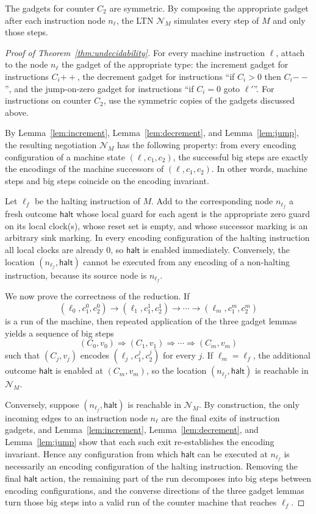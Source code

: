 The gadgets for counter $C_2$ are symmetric.  By composing the appropriate
gadget after each instruction node $n_\ell$, the LTN $\mathcal N_M$ simulates
every step of $M$ and only those steps.

\begin{proof}[Proof of Theorem~\ref{thm:undecidability}]
For every machine instruction $\ell$, attach to the node $n_\ell$ the gadget of
the appropriate type: the increment gadget for instructions $C_i{++}$, the
decrement gadget for instructions ``if $C_i>0$ then $C_i{--}$'', and the
jump-on-zero gadget for instructions ``if $C_i=0$ goto $\ell'$''.  For
instructions on counter $C_2$, use the symmetric copies of the gadgets discussed
above.

By Lemma~\ref{lem:increment}, Lemma~\ref{lem:decrement}, and
Lemma~\ref{lem:jump}, the resulting negotiation $\mathcal N_M$ has the
following property: from every encoding configuration of a machine state
$(\ell,c_1,c_2)$, the successful big steps are exactly the encodings of the
machine successors of $(\ell,c_1,c_2)$.  In other words, machine steps and big
steps coincide on the encoding invariant.

Let $\ell_f$ be the halting instruction of $M$.  Add to the corresponding node
$n_{\ell_f}$ a fresh outcome $\mathsf{halt}$ whose local guard for each agent is
the appropriate zero guard on its local clock(s), whose reset set is empty, and
whose successor marking is an arbitrary sink marking.  In every encoding
configuration of the halting instruction all local clocks are already $0$, so
$\mathsf{halt}$ is enabled immediately.  Conversely, the location
$(n_{\ell_f},\mathsf{halt})$ cannot be executed from any encoding of a
non-halting instruction, because its source node is $n_{\ell_f}$.

We now prove the correctness of the reduction.  If
\[
(\ell_0,c_1^0,c_2^0)\to (\ell_1,c_1^1,c_2^1)\to \cdots \to (\ell_m,c_1^m,c_2^m)
\]
is a run of the machine, then repeated application of the three gadget lemmas
yields a sequence of big steps
\[
(C_0,v_0)\Rightarrow (C_1,v_1)\Rightarrow \cdots \Rightarrow (C_m,v_m)
\]
such that $(C_j,v_j)$ encodes $(\ell_j,c_1^j,c_2^j)$ for every $j$.  If
$\ell_m=\ell_f$, the additional outcome $\mathsf{halt}$ is enabled at
$(C_m,v_m)$, so the location $(n_{\ell_f},\mathsf{halt})$ is reachable in
$\mathcal N_M$.

Conversely, suppose $(n_{\ell_f},\mathsf{halt})$ is reachable in
$\mathcal N_M$.  By construction, the only incoming edges to an instruction node
$n_\ell$ are the final exits of instruction gadgets, and
Lemma~\ref{lem:increment}, Lemma~\ref{lem:decrement}, and
Lemma~\ref{lem:jump} show that each such exit re-establishes the encoding
invariant.  Hence any configuration from which $\mathsf{halt}$ can be executed
at $n_{\ell_f}$ is necessarily an encoding configuration of the halting
instruction.  Removing the final $\mathsf{halt}$ action, the remaining part of
the run decomposes into big steps between encoding configurations, and the
converse directions of the three gadget lemmas turn those big steps into a valid
run of the counter machine that reaches $\ell_f$.


\end{proof}
